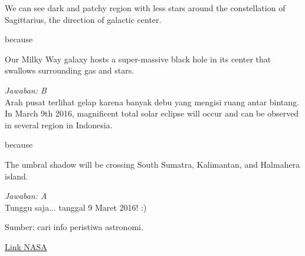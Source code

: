 \documentclass[11pt,fleqn]{exam}
\begin{document}
\begin{questions}
\question We can see dark and patchy region with less stars around the constellation of Sagittarius, the direction of galactic center.
\begin{center}
because
\end{center}
Our Milky Way galaxy hosts a super-massive black hole in its center that swallows surrounding gas and stars.

\textit{Jawaban: B}\\
Arah pusat terlihat gelap karena banyak debu yang mengisi ruang antar bintang.\\


\question In March 9th 2016, magnificent total solar eclipse will occur and can be observed in several region in Indonesia.
\begin{center}
because
\end{center}
The umbral shadow will be crossing South Sumatra, Kalimantan, and Halmahera island.

\textit{Jawaban: A}\\
Tunggu saja... tanggal 9 Maret 2016! :)

Sumber: cari info peristiwa astronomi.

\href{http://eclipse.gsfc.nasa.gov/SEgoogle/SEgoogle2001/SE2016Mar09Tgoogle.html}{Link NASA}



\end{questions}
\end{document}
